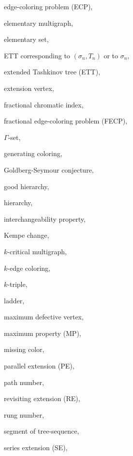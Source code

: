 \documentclass[11pt]{article}
\begin{document}
\noindent edge-coloring problem (ECP),~\pageref{ECP}

\noindent elementary multigraph,~\pageref{elementarymulti}

\noindent elementary set,~\pageref{elementaryset}

\noindent ETT corresponding to $(\sigma_n,T_n)$ or to $\sigma_n$,~\pageref{correspondingett}

\noindent extended Tashkinov tree (ETT),~\pageref{ETT}

\noindent extension vertex,~\pageref{extensionvertex}

\noindent fractional chromatic index,~\pageref{findex}

\noindent fractional edge-coloring problem (FECP),~\pageref{FECP}

\noindent $\Gamma$-set,~\pageref{gammasets}

\noindent generating coloring,~\pageref{generatingcoloring}

\noindent Goldberg-Seymour conjecture,~\pageref{GS}

\noindent good hierarchy,~\pageref{goodhierarchy}

\noindent hierarchy,~\pageref{hierar}

\noindent interchangeability property,~\pageref{interchangeproperty}

\noindent Kempe change,~\pageref{kempe}

\noindent $k$-critical multigraph,~\pageref{kcritical}

\noindent $k$-edge coloring,~\pageref{kedgecoloring}

\noindent $k$-triple,~\pageref{ktriple}

\noindent ladder,~\pageref{ladder}

\noindent maximum defective vertex,~\pageref{maximumdefective}

\noindent maximum property (MP),~\pageref{maximumproperty}

\noindent missing color,~\pageref{missingcolor}

\noindent parallel extension (PE),~\pageref{PEextension}

\noindent path number,~\pageref{pathnumber}

\noindent revisiting extension (RE),~\pageref{REextension}

\noindent rung number,~\pageref{rung}

\noindent segment of tree-sequence,~\pageref{segment}

\noindent series extension (SE),~\pageref{SEextension}
\end{document}
